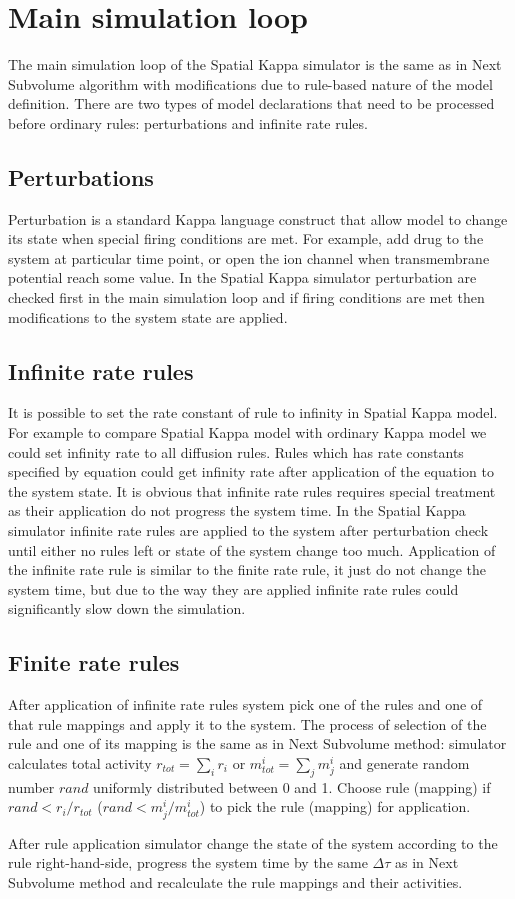 \section{Main simulation loop}
The main simulation loop of the Spatial Kappa simulator is the same as in Next Subvolume algorithm with modifications due to rule-based nature of the model definition. There are two types of model declarations that need to be processed before ordinary rules: perturbations and infinite rate rules.

\subsection{Perturbations}
Perturbation is a standard Kappa language construct that allow model to change its state when special firing conditions are met. For example, add drug to the system at particular time point, or open the ion channel when transmembrane potential reach some value. In the Spatial Kappa simulator perturbation are checked first in the main simulation loop and if firing conditions are met then modifications to the system state are applied.

\subsection{Infinite rate rules}
It is possible to set the rate constant of rule to infinity in Spatial Kappa model. For example to compare Spatial Kappa model with ordinary Kappa model we could set infinity rate to all diffusion rules. Rules which has rate constants specified by equation could get infinity rate after application of the equation to the system state. It is obvious that infinite rate rules requires special treatment as their application do not progress the system time. In the Spatial Kappa simulator infinite rate rules are applied to the system after perturbation check until either no rules left or state of the system change too much. Application of the infinite rate rule is similar to the finite rate rule, it just do not change the system time, but due to the way they are applied infinite rate rules could significantly slow down the simulation.

\subsection{Finite rate rules}
After application of  infinite rate rules system pick one of the rules and one of that rule mappings and apply it to the system. The process of selection of the rule and one of its mapping is the same as in Next Subvolume method: simulator calculates total activity $r_{tot}=\sum_{i}{r_{i}}$ or $m_{tot}^{i}=\sum_{j}{m_{j}^{i}}$ and generate random number $rand$ uniformly distributed between 0 and 1. Choose rule (mapping) if $rand < r_{i}/r_{tot}$ ($rand < m_{j}^{i}/m_{tot}^{i}$) to pick the rule (mapping) for application.

After rule application simulator change the state of the system according to the rule right-hand-side, progress the system time by the same $\Delta\tau$ as in Next Subvolume method and recalculate the rule mappings and their activities.

